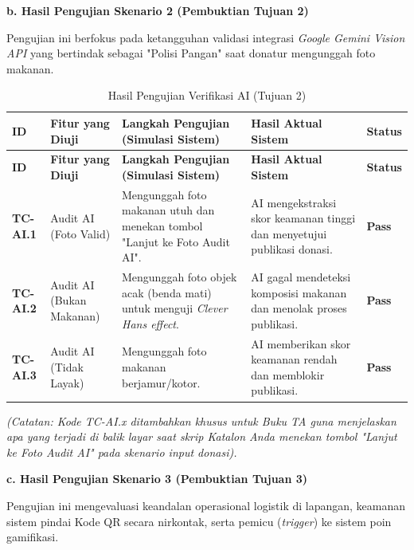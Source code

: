 \textbf{b. Hasil Pengujian Skenario 2 (Pembuktian Tujuan 2)}

Pengujian ini berfokus pada ketangguhan validasi integrasi \textit{Google Gemini Vision API} yang bertindak sebagai "Polisi Pangan" saat donatur mengunggah foto makanan.

\begin{longtable}{|>{\centering\arraybackslash}m{1.0cm}|p{2.3cm}|p{4.0cm}|p{4.0cm}|>{\centering\arraybackslash}m{1.2cm}|}
\caption{Hasil Pengujian Verifikasi AI (Tujuan 2)} \label{tab:hasil-tujuan2} \\
\hline
\rowcolor{gray!25}
\centering\textbf{ID} & \centering\textbf{Fitur yang Diuji} & \centering\textbf{Langkah Pengujian (Simulasi Sistem)} & \centering\textbf{Hasil Aktual Sistem} & \centering\arraybackslash\textbf{Status} \\ \hline
\endfirsthead

\hline
\rowcolor{gray!25}
\centering\textbf{ID} & \centering\textbf{Fitur yang Diuji} & \centering\textbf{Langkah Pengujian (Simulasi Sistem)} & \centering\textbf{Hasil Aktual Sistem} & \centering\arraybackslash\textbf{Status} \\ \hline
\endhead

\hline
\endfoot

\hline
\endlastfoot

\textbf{TC-AI.1} & Audit AI (Foto Valid) & Mengunggah foto makanan utuh dan menekan tombol "Lanjut ke Foto Audit AI". & AI mengekstraksi skor keamanan tinggi dan menyetujui publikasi donasi. & \textbf{Pass} \\ \hline
\textbf{TC-AI.2} & Audit AI (Bukan Makanan) & Mengunggah foto objek acak (benda mati) untuk menguji \textit{Clever Hans effect}. & AI gagal mendeteksi komposisi makanan dan menolak proses publikasi. & \textbf{Pass} \\ \hline
\textbf{TC-AI.3} & Audit AI (Tidak Layak) & Mengunggah foto makanan berjamur/kotor. & AI memberikan skor keamanan rendah dan memblokir publikasi. & \textbf{Pass} \\ \hline
\end{longtable}

\textit{(Catatan: Kode TC-AI.x ditambahkan khusus untuk Buku TA guna menjelaskan apa yang terjadi di balik layar saat skrip Katalon Anda menekan tombol "Lanjut ke Foto Audit AI" pada skenario input donasi).}

\textbf{c. Hasil Pengujian Skenario 3 (Pembuktian Tujuan 3)}

Pengujian ini mengevaluasi keandalan operasional logistik di lapangan, keamanan sistem pindai Kode QR secara nirkontak, serta pemicu (\textit{trigger}) ke sistem poin gamifikasi.

